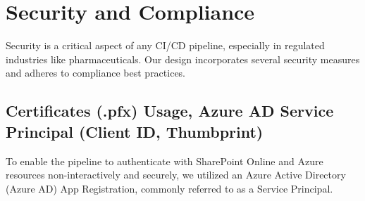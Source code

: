 \chapter{Security and Compliance}
\label{chapter:SecurityCompliance}

Security is a critical aspect of any CI/CD pipeline, especially in regulated industries like pharmaceuticals. Our design incorporates several security measures and adheres to compliance best practices.

\section{Certificates (.pfx) Usage, Azure AD Service Principal (Client ID, Thumbprint)}
\label{sec:CertificatesAzureAD}

To enable the pipeline to authenticate with SharePoint Online and Azure resources non-interactively and securely, we utilized an Azure Active Directory (Azure AD) App Registration, commonly referred to as a Service Principal.

